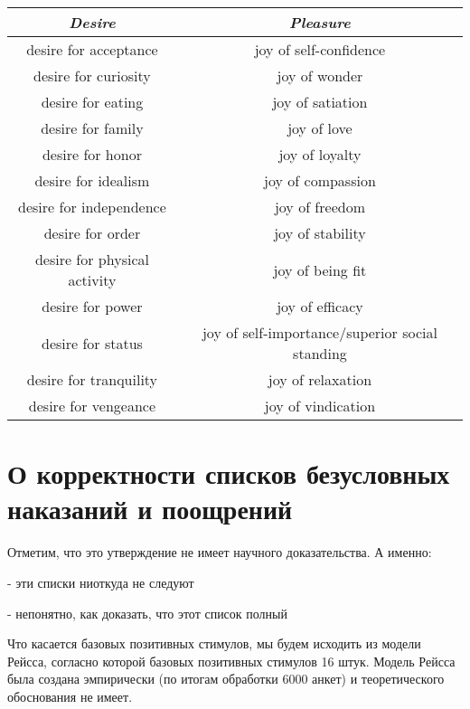 \documentclass[11pt]{article}
\theoremstyle{remark}
\theoremstyle{definition}
\begin{document}
\begin{center}
\begin{tabular}{ |c|c| } 
\hline
\textit{Desire} & \textit{Pleasure} \\ 
\hline
desire for acceptance & joy of self-confidence \\ \hline
desire for curiosity & joy of wonder \\ 
\hline
desire for eating & joy of satiation \\ 
\hline
desire for family & joy of love \\ 
\hline
desire for honor & joy of loyalty \\ 
\hline
desire for idealism & joy of compassion \\ 
\hline
desire for independence & joy of freedom \\ 
\hline
desire for order & joy of stability \\ 
\hline
desire for physical activity & joy of being fit \\ \hline
desire for power & joy of efficacy \\ 
\hline
desire for status & joy of self-importance/superior social standing \\ 
\hline
desire for tranquility & joy of relaxation \\ 
\hline
desire for vengeance & joy of vindication \\ 
\hline
\end{tabular}
\end{center}






\section{О корректности списков безусловных наказаний и поощрений}



Отметим, что это утверждение не имеет научного доказательства. А именно:

- эти списки ниоткуда не следуют

- непонятно, как доказать, что этот список полный








Что касается базовых позитивных стимулов, мы будем исходить из модели Рейсса, согласно которой базовых позитивных стимулов 16 штук. Модель Рейсса была создана эмпирически (по итогам обработки 6000 анкет) и теоретического обоснования не имеет.
\end{document}

